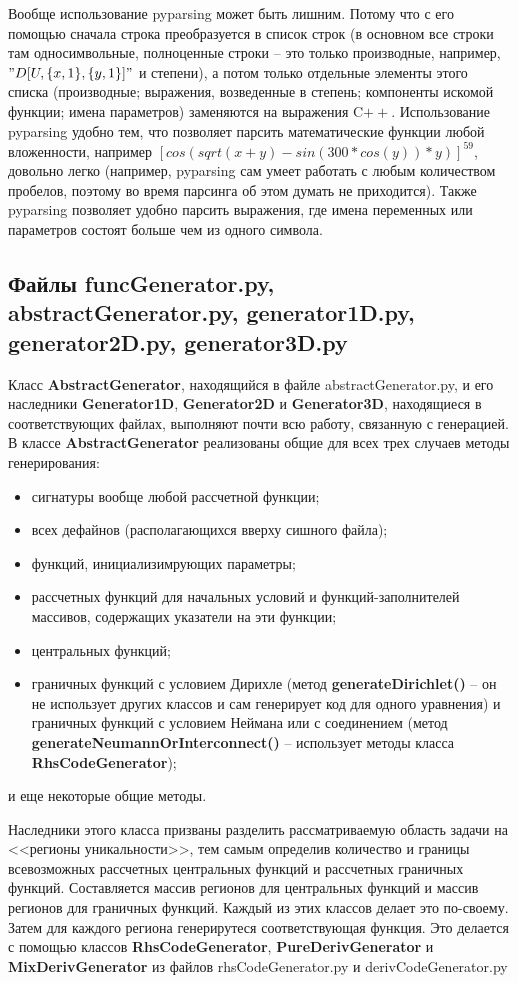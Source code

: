\documentclass[a4paper]{article}
\begin{document}
Вообще использование pyparsing может быть лишним. Потому что с его помощью сначала строка преобразуется в список строк (в основном все строки там односимвольные, полноценные строки -- это только производные, например, $"D[U,\{x,1\},\{y,1\}]"$ и степени), а потом только отдельные элементы этого списка (производные; выражения, возведенные в степень; компоненты искомой функции; имена параметров) заменяются на выражения C$++$. Использование pyparsing удобно тем, что позволяет парсить математические функции любой вложенности, например $[cos(sqrt(x + y) - sin(300 * cos(y)) * y)]^{59}$, довольно легко (например, pyparsing сам умеет работать с любым количеством пробелов, поэтому во время парсинга об этом думать не приходится). Также pyparsing позволяет удобно парсить выражения, где имена переменных или параметров состоят больше чем из одного символа.

\newpage
\subsection{\Large Файлы funcGenerator.py, abstractGenerator.py, generator1D.py, ge\-ne\-ra\-tor2D.py, generator3D.py}
Класс {\bf AbstractGenerator}, находящийся в файле abstractGenerator.py, и его наследники {\bf Ge\-ne\-ra\-tor\-1D}, {\bf Generator2D} и {\bf Generator3D}, находящиеся в соответствующих файлах, выполняют почти всю работу, связанную с генерацией. В классе {\bf AbstractGenerator} реализованы общие для всех трех случаев методы генерирования:
\begin{itemize}
\item сигнатуры вообще любой рассчетной функции;
\item всех дефайнов (располагающихся вверху сишного файла);
\item функций, инициализимрующих параметры;
\item рассчетных функций для начальных условий и функций-заполнителей массивов, содержащих указатели на эти функции;
\item центральных функций;
\item граничных функций с условием Дирихле (метод {\bf generateDirichlet()} -- он не использует других классов и сам генерирует код для одного уравнения) и граничных функций с условием Неймана или с соединением (метод {\bf ge\-ne\-rate\-Neu\-mann\-Or\-In\-ter\-con\-nect()} -- использует методы класса {\bf RhsCodeGenerator});
\end{itemize}
и еще некоторые общие методы.

Наследники этого класса призваны разделить рассматриваемую область задачи на <<регионы уникальности>>, тем самым определив количество и границы всевозможных рассчетных центральных функций и рассчетных граничных функций. Составляется массив регионов для центральных функций и массив регионов для граничных функций. Каждый из этих классов делает это по-своему. Затем для каждого региона генерирутеся соответствующая функция. Это делается с помощью классов {\bf RhsCodeGenerator}, {\bf PureDerivGenerator} и {\bf MixDerivGenerator} из файлов  rhsCodeGenerator.py и derivCodeGenerator.py
\end{document}
